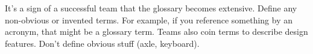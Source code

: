 \documentclass[11pt,letterpaper,oneside]{memoir}
\begin{document}
\begin{remark}
\color{blue}
It's a sign of a successful team that the glossary becomes extensive. Define any non-obvious or invented terms. For example, if you reference something by an acronym, that might be a glossary term. Teams also coin terms to describe design features. Don't define obvious stuff (axle, keyboard).  
\normalcolor
\end{remark}










  

%

\begin{appendices}
 \end{appendices}
 
\end{document}

